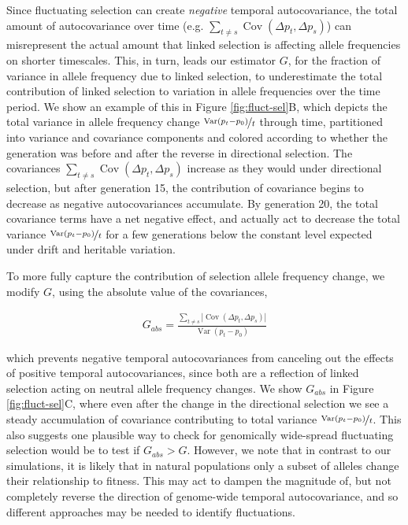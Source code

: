 \documentclass[11pt]{article}
\DeclareMathOperator{\var}{Var}
\DeclareMathOperator{\cov}{Cov}
\begin{document}
Since fluctuating selection can create \emph{negative} temporal autocovariance,
the total amount of autocovariance over time (e.g. $\sum_{t\ne s} \cov(\Delta
p_t, \Delta p_s)$) can misrepresent the actual amount that linked selection is
affecting allele frequencies on shorter timescales. This, in turn, leads our
estimator $G$, for the fraction of variance in allele frequency due to linked
selection, to underestimate the total contribution of linked selection to
variation in allele frequencies over the time period.  We show an example of
this in Figure \ref{fig:fluct-sel}B, which depicts the total variance in
allele frequency change $\nicefrac{\var(p_t - p_0)}{t}$ through time,
partitioned into variance and covariance components and colored according to
whether the generation was before and after the reverse in directional
selection. The covariances $\sum_{t\ne s} \cov(\Delta p_t, \Delta p_s)$
increase as they would under directional selection, but after generation 15,
the contribution of covariance begins to decrease as negative autocovariances
accumulate. By generation 20, the total covariance terms have a net negative
effect, and actually act to decrease the total variance $\nicefrac{\var(p_t -
p_0)}{t}$ for a few generations below the constant level expected under drift
and heritable variation.

To more fully capture the contribution of selection allele frequency change, we
modify $G$, using the absolute value of the covariances, 

\begin{align}
  \label{eq:g-abs}
  G_{abs} = \frac{\sum_{t \ne s}|\cov(\Delta p_t, \Delta p_s)|}{\var(p_t - p_0)}
\end{align}
%

which prevents negative temporal autocovariances from canceling out the effects
of positive temporal autocovariances, since both are a reflection of linked
selection acting on neutral allele frequency changes. We show $G_{abs}$ in
Figure \ref{fig:fluct-sel}C, where even after the change in the directional
selection we see a steady accumulation of covariance contributing to total
variance $\nicefrac{\var(p_t - p_0)}{t}$. This also suggests one plausible way
to check for genomically wide-spread fluctuating selection would be to test if
$G_{abs} > G$. However, we note that in contrast to our simulations, it is
likely that in natural populations only a subset of alleles change their
relationship to fitness. This may act to dampen the magnitude of, but not
completely reverse the direction of genome-wide temporal autocovariance, and so
different approaches may be needed to identify fluctuations.
\end{document}
